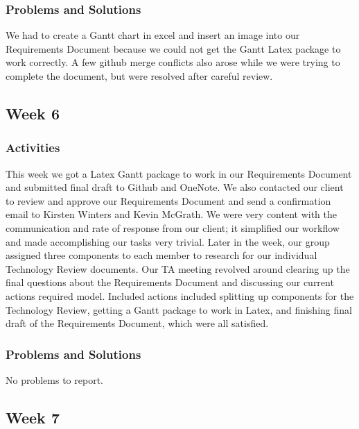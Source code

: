 \documentclass[journal,10pt,onecolumn,compsoc]{IEEEtran} \usepackage[margin=1.0in]{geometry} \usepackage{pdfpages}
\begin{document}
    \subsubsection{Problems and Solutions} 
    We had to create a Gantt chart in excel and insert an image into our Requirements Document because we could not get the Gantt Latex package to work correctly.
	A few github merge conflicts also arose while we were trying to complete the document, but were resolved after careful review.
    \subsection{Week 6}
    \subsubsection{Activities} 
    This week we got a Latex Gantt package to work in our Requirements Document and submitted final draft to Github and OneNote. We also contacted our client to review and approve our Requirements Document and send a confirmation email to Kirsten Winters and Kevin McGrath. We were very content with the communication and rate of response from our client; it simplified our workflow and made accomplishing our tasks very trivial. Later in the week, our group assigned three components to each member to research for our individual Technology Review documents.
    \noindent Our TA meeting revolved around clearing up the final questions about the Requirements Document and discussing our current actions required model. Included actions included splitting up components for the Technology Review, getting a Gantt package to work in Latex, and finishing final draft of the Requirements Document, which were all satisfied.
    
    \subsubsection{Problems and Solutions} 
	No problems to report. %
    \subsection{Week 7}
\end{document}
